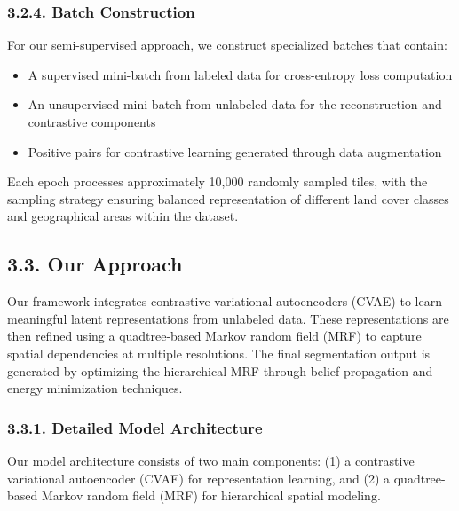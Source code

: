 \documentclass[conference]{IEEEtran}
\begin{document}
\subsubsection*{3.2.4. Batch Construction}

For our semi-supervised approach, we construct specialized batches that contain:

\begin{itemize}
    \item A supervised mini-batch from labeled data for cross-entropy loss computation
    \item An unsupervised mini-batch from unlabeled data for the reconstruction and contrastive components
    \item Positive pairs for contrastive learning generated through data augmentation
\end{itemize}

Each epoch processes approximately 10,000 randomly sampled tiles, with the sampling strategy ensuring balanced representation of different land cover classes and geographical areas within the dataset.

\subsection*{3.3. Our Approach}
Our framework integrates contrastive variational autoencoders (CVAE) to learn meaningful latent representations from unlabeled data. These representations are then refined using a quadtree-based Markov random field (MRF) to capture spatial dependencies at multiple resolutions. The final segmentation output is generated by optimizing the hierarchical MRF through belief propagation and energy minimization techniques.

\subsubsection*{3.3.1. Detailed Model Architecture}

Our model architecture consists of two main components: (1) a contrastive variational autoencoder (CVAE) for representation learning, and (2) a quadtree-based Markov random field (MRF) for hierarchical spatial modeling.
\end{document}
